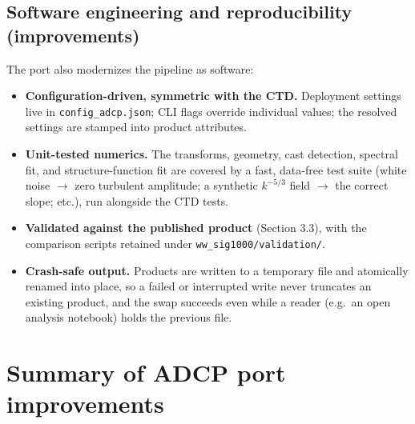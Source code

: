 \documentclass[11pt]{article}
\newcommand{\code}[1]{\texttt{#1}}
\begin{document}
\subsection{Software engineering and reproducibility (improvements)}

The port also modernizes the pipeline as software:

\begin{itemize}
\item \textbf{Configuration-driven, symmetric with the CTD.} Deployment settings live in
\code{config\_adcp.json}; CLI flags override individual values; the resolved settings are
stamped into product attributes.
\item \textbf{Unit-tested numerics.} The transforms, geometry, cast detection, spectral fit,
and structure-function fit are covered by a fast, data-free test suite (white noise $\to$ zero
turbulent amplitude; a synthetic $k^{-5/3}$ field $\to$ the correct slope; etc.), run
alongside the CTD tests.
\item \textbf{Validated against the published product} (Section 3.3), with the comparison
scripts retained under \code{ww\_sig1000/validation/}.
\item \textbf{Crash-safe output.} Products are written to a temporary file and atomically
renamed into place, so a failed or interrupted write never truncates an existing product, and
the swap succeeds even while a reader (e.g.\ an open analysis notebook) holds the previous
file.
\end{itemize}

\section{Summary of ADCP port improvements}
\end{document}
